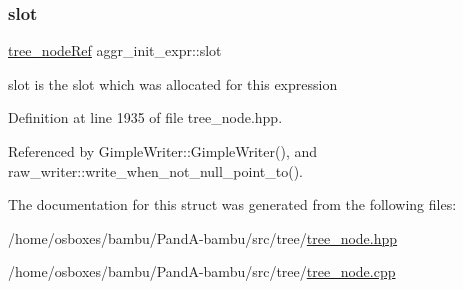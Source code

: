 \subsubsection{\texorpdfstring{slot}{slot}}
{\footnotesize\ttfamily \hyperlink{tree__node_8hpp_a6ee377554d1c4871ad66a337eaa67fd5}{tree\+\_\+node\+Ref} aggr\+\_\+init\+\_\+expr\+::slot}



slot is the slot which was allocated for this expression 



Definition at line 1935 of file tree\+\_\+node.\+hpp.



Referenced by Gimple\+Writer\+::\+Gimple\+Writer(), and raw\+\_\+writer\+::write\+\_\+when\+\_\+not\+\_\+null\+\_\+point\+\_\+to().



The documentation for this struct was generated from the following files\+:\begin{DoxyCompactItemize}
\item 
/home/osboxes/bambu/\+Pand\+A-\/bambu/src/tree/\hyperlink{tree__node_8hpp}{tree\+\_\+node.\+hpp}\item 
/home/osboxes/bambu/\+Pand\+A-\/bambu/src/tree/\hyperlink{tree__node_8cpp}{tree\+\_\+node.\+cpp}\end{DoxyCompactItemize}
